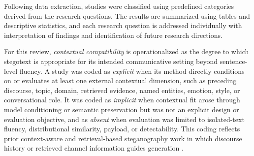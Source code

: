 Following data extraction, studies were classified using predefined categories derived from the research questions. The results are summarized using tables and descriptive statistics, and each research question is addressed individually with interpretation of findings and identification of future research directions.

For this review, \emph{contextual compatibility} is operationalized as the degree to which stegotext is appropriate for its intended communicative setting beyond sentence-level fluency. A study was coded as \emph{explicit} when its method directly conditions on or evaluates at least one external contextual dimension, such as preceding discourse, topic, domain, retrieved evidence, named entities, emotion, style, or conversational role. It was coded as \emph{implicit} when contextual fit arose through model conditioning or semantic preservation but was not an explicit design or evaluation objective, and as \emph{absent} when evaluation was limited to isolated-text fluency, distributional similarity, payload, or detectability. This coding reflects prior context-aware and retrieval-based steganography work in which discourse history or retrieved channel information guides generation \cite{ding2023context,wang2023hi,liao2024co}.
